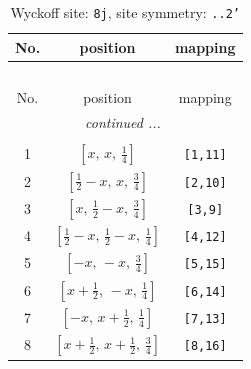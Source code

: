 \documentclass[fleqn,8pt]{jsarticle}
\begin{document}
\begin{longtable}{ccc}
\caption{Wyckoff site: {\tt 8j}, site symmetry: {\tt ..2'}}
 \\
 \hline \hline
No. & position & mapping \\ \hline \endfirsthead

\multicolumn{2}{l}{\tablename\ \thetable{}} \\
 \hline \hline
No. & position & mapping \\ \hline \endhead

 \hline \hline
\multicolumn{2}{r}{\footnotesize\it continued ...} \\ \endfoot

 \hline \hline
\multicolumn{2}{r}{} \\ \endlastfoot

1 & $\left[ x,\, x,\, \frac{1}{4} \right]$ & {\tt [1,11]} \\ \hline
2 & $\left[ \frac{1}{2} - x,\, x,\, \frac{3}{4} \right]$ & {\tt [2,10]} \\ \hline
3 & $\left[ x,\, \frac{1}{2} - x,\, \frac{3}{4} \right]$ & {\tt [3,9]} \\ \hline
4 & $\left[ \frac{1}{2} - x,\, \frac{1}{2} - x,\, \frac{1}{4} \right]$ & {\tt [4,12]} \\ \hline
5 & $\left[ - x,\, - x,\, \frac{3}{4} \right]$ & {\tt [5,15]} \\ \hline
6 & $\left[ x + \frac{1}{2},\, - x,\, \frac{1}{4} \right]$ & {\tt [6,14]} \\ \hline
7 & $\left[ - x,\, x + \frac{1}{2},\, \frac{1}{4} \right]$ & {\tt [7,13]} \\ \hline
8 & $\left[ x + \frac{1}{2},\, x + \frac{1}{2},\, \frac{3}{4} \right]$ & {\tt [8,16]} \\
\end{longtable}
\renewcommand{\arraystretch}{1.2}
\end{document}
